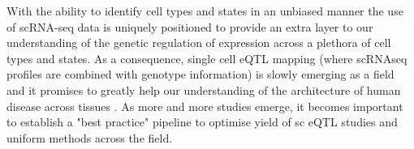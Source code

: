 


















With the ability to identify cell types and states in an unbiased manner the use of scRNA-seq data is uniquely positioned to provide an extra layer to our understanding of the genetic regulation of expression across a plethora of cell types and states.
As a consequence, single cell eQTL mapping (where scRNAseq profiles are combined with genotype information) is slowly emerging as a field and it promises to greatly help our understanding of the architecture of human disease across tissues \cite{van2018single, cuomo2020single, jerber2020population, van2020single}.
As more and more studies emerge, it becomes important to establish a "best practice" pipeline to optimise yield of sc eQTL studies and uniform methods across the field.\\

